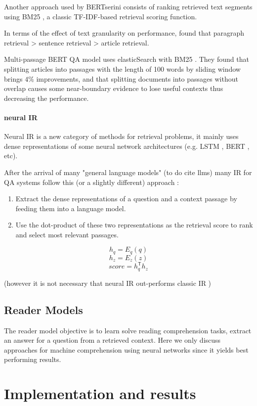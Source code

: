 \documentclass[a4paper,12pt]{article}
\begin{document}
Another approach used by BERTserini \cite{BERTserini} consists of ranking retrieved text segments using BM25 \cite{BM25}, a classic TF-IDF-based retrieval scoring function.

In terms of the effect of text granularity on performance, \cite{BERTserini} found that paragraph retrieval > sentence retrieval > article retrieval.

Multi-passage BERT QA model \cite{multibert} uses elasticSearch with BM25 \cite{BM25}. They found that splitting articles into passages with the length of 100 words by sliding window brings $4\%$ improvements, and that splitting documents into passages without overlap causes some near-boundary evidence to lose useful contexts thus decreasing the performance.

\paragraph{neural IR}
Neural IR is a new category of methods for retrieval problems, it mainly uses dense representations of some neural network architectures (e.g. LSTM \cite{lstm}, BERT \cite{bert}, etc). 

After the arrival of many "general language models" (to do cite llms) many IR for QA systems follow this (or a slightly different) approach :
\begin{enumerate}
    \item Extract the dense representations of a question and a context passage by feeding them into a language model.
    \item Use the dot-product of these two representations as the retrieval score to rank and select most relevant passages.
\end{enumerate}

$$h_q=E_q(q)$$ 
$$h_z=E_z(z)$$
$$score=h_q^\mathsf{T} h_z$$

(however it is not necessary that neural IR out-performs classic IR \cite{lin})

\subsection{Reader Models}
The reader model objective is to learn solve reading comprehension tasks, extract an answer for a question from a retrieved context. 
Here we only discuss approaches for machine comprehension using neural networks since it yields best performing results.

\clearpage
\section{Implementation and results}
\end{document}
